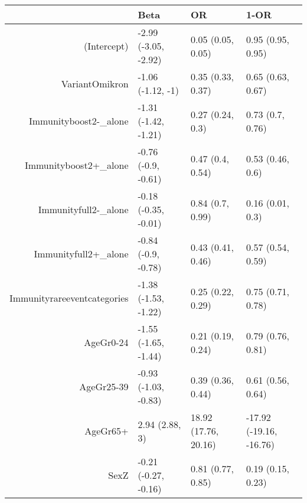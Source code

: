 \begin{table}[ht]
\centering
\begin{tabular}{rlll}
  \hline
 & Beta & OR & 1-OR \\ 
  \hline
(Intercept) & -2.99 (-3.05, -2.92) & 0.05 (0.05, 0.05) & 0.95 (0.95, 0.95) \\ 
  VariantOmikron & -1.06 (-1.12, -1) & 0.35 (0.33, 0.37) & 0.65 (0.63, 0.67) \\ 
  Immunityboost2-\_alone & -1.31 (-1.42, -1.21) & 0.27 (0.24, 0.3) & 0.73 (0.7, 0.76) \\ 
  Immunityboost2+\_alone & -0.76 (-0.9, -0.61) & 0.47 (0.4, 0.54) & 0.53 (0.46, 0.6) \\ 
  Immunityfull2-\_alone & -0.18 (-0.35, -0.01) & 0.84 (0.7, 0.99) & 0.16 (0.01, 0.3) \\ 
  Immunityfull2+\_alone & -0.84 (-0.9, -0.78) & 0.43 (0.41, 0.46) & 0.57 (0.54, 0.59) \\ 
  Immunityrareeventcategories & -1.38 (-1.53, -1.22) & 0.25 (0.22, 0.29) & 0.75 (0.71, 0.78) \\ 
  AgeGr0-24 & -1.55 (-1.65, -1.44) & 0.21 (0.19, 0.24) & 0.79 (0.76, 0.81) \\ 
  AgeGr25-39 & -0.93 (-1.03, -0.83) & 0.39 (0.36, 0.44) & 0.61 (0.56, 0.64) \\ 
  AgeGr65+ & 2.94 (2.88, 3) & 18.92 (17.76, 20.16) & -17.92 (-19.16, -16.76) \\ 
  SexZ & -0.21 (-0.27, -0.16) & 0.81 (0.77, 0.85) & 0.19 (0.15, 0.23) \\ 
   \hline
\end{tabular}
\end{table}
